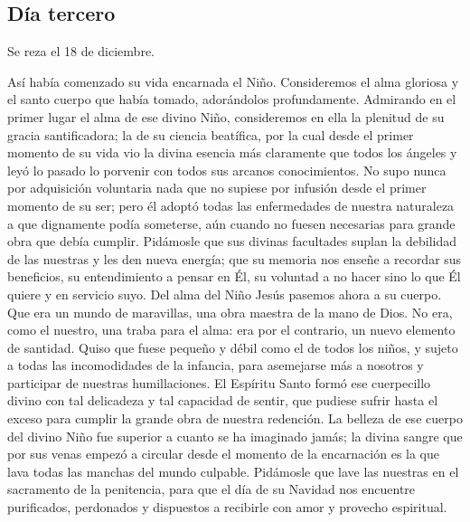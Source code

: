 \documentclass[spanish,utf8,twocolumn]{chlart}
\newenvironment{summary}{\begingroup
	\small\sffamily\itshape%
	\setlength{\leftskip}{3em}\setlength{\rightskip}{3em}\noindent
	}{\par\endgroup}
\newenvironment{lectura}{\begingroup\color{lector}}{\endgroup\par}
\begin{document}
\subsection*{Día tercero}
\begin{summary}
Se reza el 18 de diciembre.
\end{summary}
\begin{lectura}
Así había comenzado su vida encarnada el Niño.
Consideremos el alma gloriosa y el santo cuerpo que había tomado,
adorándolos profundamente.
Admirando en el primer lugar el alma de ese divino Niño, consideremos en
ella la plenitud de su gracia santificadora; la de su ciencia beatífica,
por la cual desde el primer momento de su vida vio la divina esencia más
claramente que todos los ángeles y leyó lo pasado lo porvenir con todos
sus arcanos conocimientos.
No supo nunca por adquisición voluntaria nada que no supiese por
infusión desde el primer momento de su ser; pero él adoptó todas las
enfermedades de nuestra naturaleza a que dignamente podía someterse, aún
cuando no fuesen necesarias para grande obra que debía cumplir.
Pidámosle que sus divinas facultades suplan la debilidad de las nuestras
y les den nueva energía; que su memoria nos enseñe a recordar sus
beneficios, su entendimiento a pensar en Él, su voluntad a no hacer sino
lo que Él quiere y en servicio suyo.
Del alma del Niño Jesús pasemos ahora a su cuerpo.
Que era un mundo de maravillas, una obra maestra de la mano de Dios.
No era, como el nuestro, una traba para el alma:
era por el contrario, un nuevo elemento de santidad.
Quiso que fuese pequeño y débil como el de todos los niños, y sujeto a
todas las incomodidades de la infancia, para asemejarse más a nosotros y
participar de nuestras humillaciones.
El Espíritu Santo formó ese cuerpecillo divino con tal delicadeza y tal
capacidad de sentir, que pudiese sufrir hasta el exceso para cumplir la
grande obra de nuestra redención.
La belleza de ese cuerpo del divino Niño fue superior a cuanto se ha
imaginado jamás; la divina sangre que por sus venas empezó a circular
desde el momento de la encarnación es la que lava todas las manchas del
mundo culpable.
Pidámosle que lave las nuestras en el sacramento de la penitencia, para
que el día de su Navidad nos encuentre purificados, perdonados y
dispuestos a recibirle con amor y provecho espiritual.
\end{lectura}
\end{document}

